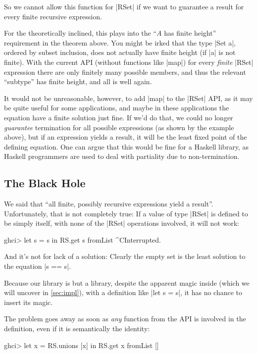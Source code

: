 \documentclass[manuscript,screen,acmsmall,nonacm]{acmart}
\begin{document}
So we cannot allow this function for |RSet| if we want to guarantee a result for every finite recursive expression.

For the theoretically inclined, this plays into the “$A$ has finite height” requirement in the theorem above. You might be irked that the type |Set a|, ordered by subset inclusion, does not actually have finite height (if |a| is not finite). With the current API (without functions like |map|) for every \emph{finite} |RSet| expression there are only finitely many possible members, and thus the relevant “subtype” has finite height, and all is well again.

It would not be unreasonable, however, to add |map| to the |RSet| API, as it may be quite useful for some applications, and maybe in these applications the equation have a finite solution just fine. If we'd do that, we could no longer \emph{guarantee} termination for all possible expressions (as shown by the example above), but if an expression yields a result, it will be the least fixed point of the defining equation. One can argue that this would be fine for a Haskell library, as Haskell programmers are used to deal with partiality due to non-termination.

\subsection{The Black Hole}\label{sec:blackhole}

We said that “all finite, possibly recursive expressions yield a result”. Unfortunately, that is not completely true: If a value of type |RSet| is defined to be simply itself, with none of the |RSet| operations involved, it will not work:
\begin{code}
ghci> let s = s in RS.get s
fromList ^CInterrupted.
\end{code}
And it’s not for lack of a solution: Clearly the empty set is the least solution to the equation |s == s|.

Because our library is but a library, despite the apparent magic inside (which we will uncover in \cref{sec:impl}), with a definition like |let s = s|, it has no chance to insert its magic.

The problem goes away as soon as \emph{any} function from the API is involved in the definition, even if it is semantically the identity:
\begin{code}
ghci> let x = RS.unions [x] in RS.get x
fromList []
\end{code}
\end{document}
